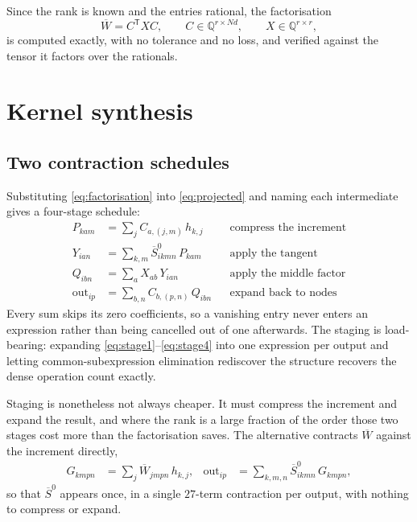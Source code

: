 \documentclass[11pt]{article}
\newcommand{\Q}{\mathbb{Q}}
\newcommand{\Wbar}{\overline{W}}
\newcommand{\Sbar}{\overline{S}}
\begin{document}
Since the rank is known and the entries rational, the factorisation
\begin{equation}
  \Wbar = C^{\mathsf T} X C ,
  \qquad C \in \Q^{r \times Nd},
  \qquad X \in \Q^{r \times r},
  \label{eq:factorisation}
\end{equation}
is computed exactly, with no tolerance and no loss, and verified against the
tensor it factors over the rationals.

\section{Kernel synthesis}
\label{sec:schedule}

\subsection{Two contraction schedules}

Substituting \eqref{eq:factorisation} into \eqref{eq:projected} and naming each
intermediate gives a four-stage schedule:
\begin{align}
  P_{kam} &= \sum_j C_{a,(j,m)}\, h_{k,j}
            && \text{compress the increment} \label{eq:stage1}\\
  Y_{ian} &= \sum_{k,m} \Sbar^0_{ikmn}\, P_{kam}
            && \text{apply the tangent} \\
  Q_{ibn} &= \sum_a X_{ab}\, Y_{ian}
            && \text{apply the middle factor} \\
  \text{out}_{ip} &= \sum_{b,n} C_{b,(p,n)}\, Q_{ibn}
            && \text{expand back to nodes} \label{eq:stage4}
\end{align}
Every sum skips its zero coefficients, so a vanishing entry never enters an
expression rather than being cancelled out of one afterwards.  The staging is
load-bearing: expanding \eqref{eq:stage1}--\eqref{eq:stage4} into one expression
per output and letting common-subexpression elimination rediscover the structure
recovers the dense operation count exactly.

Staging is nonetheless not always cheaper.  It must compress the increment and
expand the result, and where the rank is a large fraction of the order those two
stages cost more than the factorisation saves.  The alternative contracts
$\Wbar$ against the increment directly,
\begin{align}
  G_{kmpn} &= \sum_j \Wbar_{jmpn}\, h_{k,j} ,
  &
  \text{out}_{ip} &= \sum_{k,m,n} \Sbar^0_{ikmn}\, G_{kmpn} ,
  \label{eq:direct}
\end{align}
so that $\Sbar^0$ appears once, in a single $27$-term contraction per output,
with nothing to compress or expand.
\end{document}
